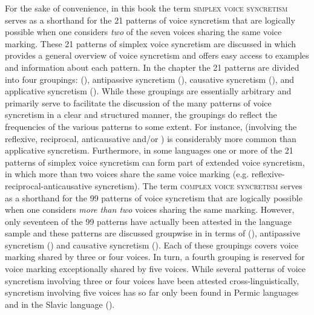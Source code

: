 For the sake of convenience, in this book the term \textsc{simplex voice syncretism} serves as a shorthand for the 21 patterns of voice syncretism that are logically possible when one considers \textit{two} of the seven voices sharing the same voice marking. These 21 patterns of simplex voice syncretism are discussed in  which provides a general overview of voice syncretism and offers easy access to examples and information about each pattern. In the chapter the 21 patterns are divided into four groupings:  (), antipassive syncretism (), causative syncretism (), and applicative syncretism (). While these groupings are essentially arbitrary and primarily serve to facilitate the discussion of the many patterns of voice syncretism in a clear and structured manner, the groupings do reflect the frequencies of the various patterns to some extent. For instance,  (involving the reflexive, reciprocal, anticausative and/or ) is considerably more common than applicative syncretism. Furthermore, in some languages one or more of the 21 patterns of simplex voice syncretism can form part of extended voice syncretism, in which more than two voices share the same voice marking (e.g. reflexive-reciprocal-anticausative syncretism). The term \textsc{complex voice syncretism} serves as a shorthand for the 99 patterns of voice syncretism that are logically possible when one considers \textit{more than two} voices sharing the same marking. However, only seventeen of the 99 patterns have actually been attested in the language sample and these patterns are discussed groupwise in  in terms of  (), antipassive syncretism () and causative syncretism (). Each of these groupings covers voice marking shared by three or four voices. In turn, a fourth grouping is reserved for voice marking exceptionally shared by five voices. While several patterns of voice syncretism involving three or four voices have been attested cross-linguistically, syncretism involving five voices has so far only been found in Permic languages and in the Slavic language  ().

